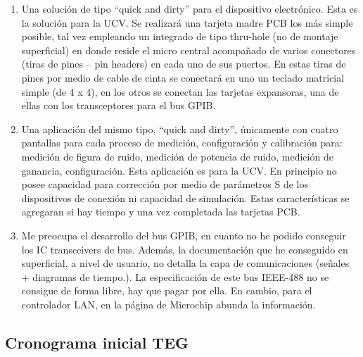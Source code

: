 \documentclass[paper=letter,oneside,fontsize=12pt, parskip=full]{article}
\begin{document}
	\begin{enumerate}
	
		\item Una solución de tipo “quick and dirty” para el dispositivo electrónico. Esta es la solución para la UCV. Se realizará una tarjeta madre PCB los más simple posible, tal vez empleando un integrado de tipo thru-hole (no de montaje superficial) en donde reside el micro central acompañado de varios conectores (tiras de pines – pin headers) en cada uno de sus puertos. En estas tiras de pines por medio de cable de cinta se conectará en uno un teclado matricial simple (de 4 x 4), en los otros se conectan las tarjetas expansoras, una de ellas con los transceptores para el bus GPIB.
		
		\item Una aplicación del mismo tipo, “quick and dirty”, únicamente con cuatro pantallas para cada proceso de medición, configuración y calibración para: medición de figura de ruido, medición de potencia de ruido, medición de ganancia, configuración. Esta aplicación es para la UCV. En principio no posee capacidad para corrección por medio de parámetros S de los dispositivos de conexión ni capacidad de simulación. Estas características se agregaran si hay tiempo y una vez completada las tarjetas PCB.
		
		\item Me preocupa el desarrollo del bus GPIB, en cuanto no he podido conseguir los IC transceivers de bus. Además, la documentación que he conseguido en superficial, a nivel de usuario, no detalla la capa de comunicaciones (señales + diagramas de tiempo.). La especificación de este bus IEEE-488 no se consigue de forma libre, hay que pagar por ella. En cambio, para el controlador LAN, en la página de Microchip abunda la información.
	
	\end{enumerate}
	
	\subsection{Cronograma inicial TEG}
	
\end{document}
